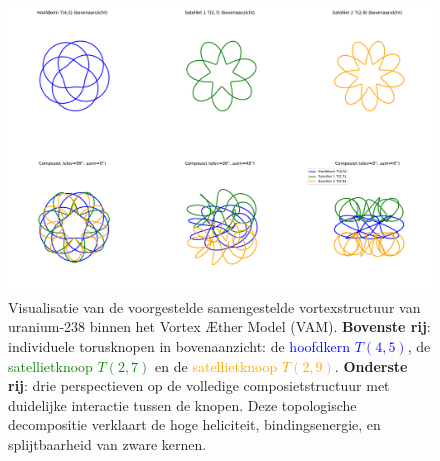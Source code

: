 \begin{figure}[H]
    \centering
    \includegraphics[width=\textwidth]{sections/0_UraniumKnoop}
    \caption[Samengestelde vortexstructuur van uranium-238 in VAM]{
        Visualisatie van de voorgestelde samengestelde vortexstructuur van uranium-238 binnen het Vortex Æther Model (VAM).
        \textbf{Bovenste rij}: individuele torusknopen in bovenaanzicht:
        de \textcolor{blue}{hoofdkern \(T(4,5)\)}, de \textcolor{green}{satellietknoop \(T(2,7)\)} en de \textcolor{orange}{satellietknoop \(T(2,9)\)}.
        \textbf{Onderste rij}: drie perspectieven op de volledige composietstructuur met duidelijke interactie tussen de knopen.
        Deze topologische decompositie verklaart de hoge heliciteit, bindingsenergie, en splijtbaarheid van zware kernen.
    }
    \label{fig:uranium_2x3}
\end{figure}

